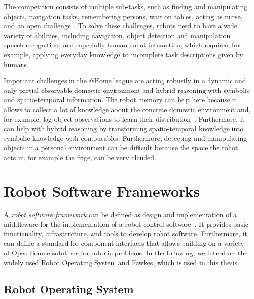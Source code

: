 The competition consists of multiple sub-tasks,
such as finding and manipulating objects, navigation tasks,
remembering persons, wait on tables, acting as
nurse, and an open challenge~\cite{athome-rules}.
To solve these challenges, robots need to
have a wide variety of abilities, including navigation, object
detection and manipulation, speech recognition, and especially human
robot interaction, which requires, for example, applying everyday
knowledge to incomplete task descriptions given by humans.

Important challenges in the @Home league are acting robustly in a
dynamic and only partial observable domestic environment and hybrid
reasoning with symbolic and spatio-temporal information.
The robot memory can help here because it allows to collect a lot
of knowledge about the concrete domestic environment and, for example,
log object observations to learn their distribution~\cite{deebul}.
Furthermore, it can help with hybrid reasoning by transforming
spatio-temporal knowledge into symbolic knowledge with computables.
Furthermore, detecting and manipulating objects in a personal
environment can be difficult because the space the robot acts in, for
example the frige, can be very clouded.

\section{Robot Software Frameworks}
\label{sec:robot-software-frameworks}
A \emph{robot software framework} can be defined as design and
implementation of a middleware for the implementation of a robot
control software~\cite{tnthesis}.  It provides basic functionality,
infrastructure, and tools to develop robot software. Furthermore, it
can define a standard for component interfaces that allows building on
a variety of Open Source solutions for robotic problems. In the
following, we introduce the widely used Robot Operating System and
Fawkes, which is used in this thesis.
\subsection{Robot Operating System}
\label{sec:ros}
